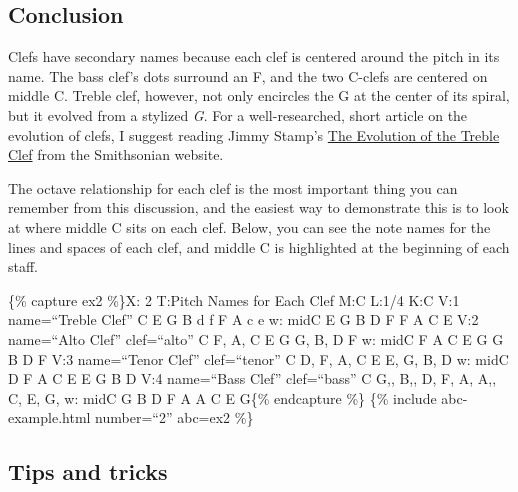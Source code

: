 \documentclass{book}
\begin{document}
\hypertarget{conclusion-7}{%
\subsection{Conclusion}\label{conclusion-7}}

Clefs have secondary names because each clef is centered around the pitch in
its name. The bass clef's dots surround an F, and the two C-clefs are centered
on middle C. Treble clef, however, not only encircles the G at the center of
its spiral, but it evolved from a stylized \emph{G}. For a well-researched,
short article on the evolution of clefs, I suggest reading Jimmy Stamp's
\href{http://www.smithsonianmag.com/arts-culture/the-evolution-of-the-treble-clef-87122373/}{The
Evolution of the Treble Clef} from the Smithsonian website.

The octave relationship for each clef is the most important thing you can
remember from this discussion, and the easiest way to demonstrate this is to
look at where middle C sits on each clef. Below, you can see the note names
for the lines and spaces of each clef, and middle C is highlighted at the
beginning of each staff.

\{\% capture ex2 \%\}X: 2 T:Pitch Names for Each Clef M:C L:1/4 K:C V:1
name=``Treble Clef'' C \textbar{} E G B d f\textbar{} F A c e\textbar{]} w:
midC E G B D F F A C E V:2 name=``Alto Clef'' clef=``alto'' C \textbar{} F, A,
C E G\textbar{} G, B, D F\textbar{]} w: midC F A C E G G B D F V:3
name=``Tenor Clef'' clef=``tenor'' C \textbar{} D, F, A, C E\textbar{} E, G,
B, D\textbar{]} w: midC D F A C E E G B D V:4 name=``Bass Clef'' clef=``bass''
C \textbar{} G,, B,, D, F, A,\textbar{} A,, C, E, G,\textbar{]} w: midC G B D
F A A C E G\{\% endcapture \%\} \{\% include abc-example.html number=``2''
abc=ex2 \%\}

\hypertarget{tips-and-tricks}{%
\subsection{Tips and tricks}\label{tips-and-tricks}}
\end{document}

